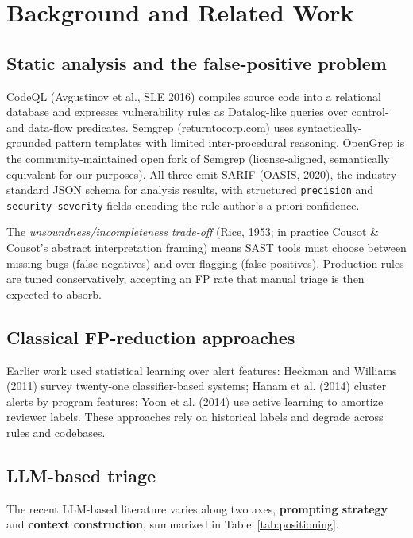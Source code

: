 \documentclass[11pt,a4paper]{article}
\begin{document}
\section{Background and Related Work}
\label{sec:related}

\subsection{Static analysis and the false-positive problem}

CodeQL (Avgustinov et al., SLE 2016) compiles source code into a
relational database and expresses vulnerability rules as Datalog-like
queries over control- and data-flow predicates. Semgrep
(returntocorp.com) uses syntactically-grounded pattern templates with
limited inter-procedural reasoning. OpenGrep is the
community-maintained open fork of Semgrep (license-aligned,
semantically equivalent for our purposes). All three emit SARIF
(OASIS, 2020), the industry-standard JSON schema for analysis results,
with structured \texttt{precision} and \texttt{security-severity}
fields encoding the rule author's a-priori confidence.

The \emph{unsoundness/incompleteness trade-off} (Rice, 1953; in
practice Cousot \& Cousot's abstract interpretation framing) means
SAST tools must choose between missing bugs (false negatives) and
over-flagging (false positives). Production rules are tuned
conservatively, accepting an FP rate that manual triage is then
expected to absorb.

\subsection{Classical FP-reduction approaches}

Earlier work used statistical learning over alert features:
Heckman and Williams (2011) survey twenty-one classifier-based systems;
Hanam et al. (2014) cluster alerts by program features; Yoon et al.
(2014) use active learning to amortize reviewer labels. These
approaches rely on historical labels and degrade across rules and
codebases.

\subsection{LLM-based triage}
\label{sec:llm-triage}

The recent LLM-based literature varies along two axes,
\textbf{prompting strategy} and \textbf{context construction},
summarized in Table~\ref{tab:positioning}.
\end{document}
